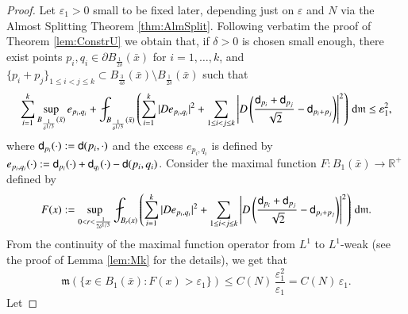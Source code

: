 \documentclass[11pt,reqno]{amsart}
\newcommand{\mm}{\mathfrak m}
\newcommand{\sfd}{{\sf d}}
\renewcommand{\d}{{\rm{d}}}
\newcommand{\R}{\mathbb{R}}
\newcommand{\vare}{\varepsilon}
\theoremstyle{definition}
\theoremstyle{remark}
\theoremstyle{remark}
\theoremstyle{remark}
\theoremstyle{remark}
\theoremstyle{remark}
\theoremstyle{remark}
\theoremstyle{remark}
\begin{document}
 \begin{proof}
 Let $\vare_{1}>0$ small to be fixed later, depending just on $\vare$ and $N$ via the Almost Splitting Theorem \ref{thm:AlmSplit}.
 Following verbatim the proof of Theorem \ref{lem:ConstrU}  we obtain that, if  $\delta>0$ is chosen small enough,  there exist points $p_{i}, q_{i} \in \partial B_{\frac{1}{2\delta}}(\bar{x})$ for $i=1,\ldots, k$,  and $\{p_{i} + p_{j}\}_{1\leq i<j \leq k} \subset  B_{\frac{3}{4\delta}}(\bar{x}) \setminus  B_{\frac{1}{2\delta}}(\bar{x})$ such that
 \begin{equation}
\sum_{i=1}^{k} \sup_{B_{\frac{1}{\delta^{1/3}}}(\bar{x})} e_{p_{i},q_{i}}+  \fint _{B_{\frac{1}{\delta^{1/3}}}(\bar{x})} \left( \sum_{i=1}^k  |D e_{p_i,q_i}|^2 + \sum_{1\leq i< j\leq k}   \left|D \left( \frac{\sfd_{p_i}+ \sfd_{p_j}} {\sqrt 2} - \sfd_{p_i+p_j}\right) \right|^2 \right) \, \d \mm \leq \vare_{1}^{2},
 \end{equation}
where $\sfd_{p_i}(\cdot):=\sfd(p_i, \cdot)$ and the excess $e_{p_i,q_i}$ is defined by $e_{p_i,q_i}(\cdot):=\sfd_{p_i}(\cdot)+\sfd_{q_i}(\cdot)-\sfd(p_i,q_i)$.   
Consider the maximal function $F:B_1(\bar{x})\to \R^+$ defined by 
\begin{equation}\label{eq:defMkEPSREG}
F(x):= \sup_{0<r<\frac{1}{2\delta^{1/3}}}  \fint _{B_{r}(x)} \left( \sum_{i=1}^k  |D e_{p_i,q_i}|^2 + \sum_{1\leq i< j\leq k}   \left|D \left( \frac{\sfd_{p_i}+ \sfd_{p_j}} {\sqrt 2} - \sfd_{p_i+p_j}\right) \right|^2 \right) \, \d \mm.
\end{equation}
From the continuity of the maximal function operator from $L^{1}$ to $L^{1}$-weak  (see the proof of Lemma \ref{lem:Mk} for the details), we get that
\begin{equation} \label{eq:Mke1EPSREG}
 \mm(\{x \in  B_1(\bar{x}) : F(x)>\vare_{1} \})\leq C(N) \, \frac{\vare_{1}^{2}}{\vare_{1}} = C(N) \, \vare_{1}.
\end{equation}
Let 

\end{proof}
\end{document}
